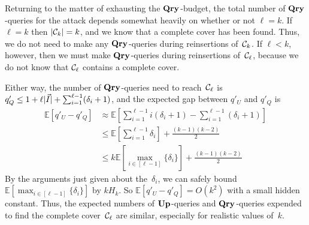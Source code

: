 Returning to the matter of exhausting the $\textup{\textbf{Qry}}\hspace{0.5pt}$-budget, the total number of $\textup{\textbf{Qry}}\hspace{0.5pt}$-queries for the attack depends somewhat heavily on whether or not $\ell=k$.  If $\ell = k$ then $|\mathcal{C}_k|=k$, and we know that a complete cover has been found.  Thus, we do not need to make any $\textup{\textbf{Qry}}\hspace{0.5pt}$-queries during reinsertions of~$\mathcal{C}_k$.  If $\ell < k$, however, then we must make $\textup{\textbf{Qry}}\hspace{0.5pt}$-queries during reinsertions of~$\mathcal{C}_\ell$, because we do not know that $\mathcal{C}_\ell$ contains a complete cover.  

Either way, the number of $\textup{\textbf{Qry}}\hspace{0.5pt}$-queries need to reach~$\mathcal{C}_\ell$ is 
$q'_Q \leq 1 + \ell|\vec{I}| + \sum_{i=1}^{\ell-1}(\delta_i +1)$, and the expected gap between $q'_U$ and $q'_Q$ is 
\begin{align*}
	\mathbb{E}[q'_U - q'_Q] &\approx \mathbb{E}\left[\sum_{i=1}^{\ell-1}i(\delta_i +1) - \sum_{i=1}^{\ell-1}(\delta_i +1)\right] \\
	&\leq \mathbb{E}\left[\sum_{i=1}^{\ell-1}\delta_i \right] + \frac{(k-1)(k-2)}{2}\\
	& \leq k\mathbb{E}\left[\max_{i\in[\ell-1]}\{\delta_i\}\right] + \frac{(k-1)(k-2)}{2}
\end{align*}
By the arguments just given about the~$\delta_i$, we can safely bound $\mathbb{E}\left[\max_{i\in[\ell-1]}\{\delta_i\}\right]$ by $kH_k$.  So $\mathbb{E}[q'_U - q'_Q] = O(k^2)$ with a small hidden constant.
Thus, the expected numbers of $\textup{\textbf{Up}}\hspace{0.5pt}$-queries and $\textup{\textbf{Qry}}\hspace{0.5pt}$-queries expended to find the complete cover~$\mathcal{C}_\ell$ are similar, especially for realistic values of~$k$.  

